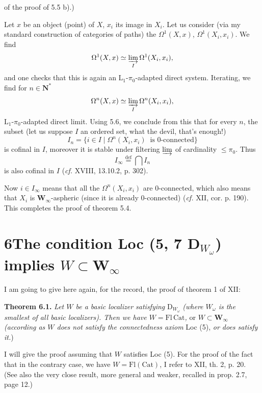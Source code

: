 
of the proof of 5.5 b).)

Let $x$ be an object (point) of $X$, $x_i$ its image in $X_i$. Let us consider (via my standard construction of categories of paths) the $\Omega^1(X,x)$, $\Omega^1(X_i,x_i)$. We find
\[ \Omega^1(X,x) \simeq \varinjlim_{I} \Omega^1(X_i,x_i), \]
and one checks that this is again an $\mathrm{L}_1$-$\pi_0$-adapted direct system. Iterating, we find for $n \in \mathbf{N}^*$
\[ \Omega^n(X,x) \simeq \varinjlim_{I} \Omega^n(X_i,x_i), \]
$\mathrm{L}_1$-$\pi_0$-adapted direct limit. Using 5.6, we conclude from this that for every $n$, the subset (let us suppose $I$ an ordered set, what the devil, that's enough!)
\[ I_n = \{ i \in I \mid \Omega^n(X_i,x_i) \ \text{ is 0-connected} \} \]
is cofinal in $I$, moreover it is stable under filtering $\varinjlim$ of cardinality $\leq \pi_0$. Thus %
\[ I_\infty \overset{\text{def}}{=} \bigcap I_n \]
is also cofinal in $I$ (\textit{cf.} XVIII, 13.10.2, p. 302).

Now $i \in I_\infty$ means that all the $\Omega^n(X_i,x_i)$ are 0-connected, which also means that $X_i$ is $\mathbf{W}_\infty$-aspheric (since it is already 0-connected) (\textit{cf.} XII, cor. p. 190). This completes the proof of theorem 5.4.

\section*{6\quad The condition Loc (5, 7 D$_{W_\omega}$) implies $W \subset \mathbf{W}_\infty$}

I am going to give here again, for the record, the proof of theorem 1 of XII:

\textbf{Theorem 6.1.} \textit{Let $W$ be a basic localizer satisfying} D$_{W_\omega}$ \textit{(where $W_\omega$ is the smallest of all basic localizers). Then we have $W = \mathrm{Fl}\,\mathrm{Cat}$,} or \textit{$W \subset \mathbf{W}_\infty$ (according as $W$ does not satisfy the connectedness axiom} Loc (5), \textit{or does satisfy it.})

I will give the proof assuming that $W$ satisfies Loc (5). For the proof of the fact that in the contrary case, we have $W = \mathrm{Fl}(\mathrm{Cat})$, I refer to XII, th. 2, p. 20. (See also the very close result, more general and weaker, recalled in prop. 2.7, page 12.)


